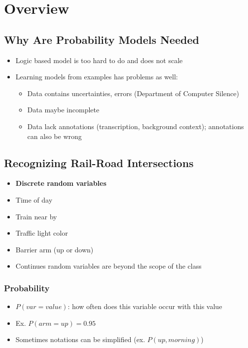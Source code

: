 \section{Overview}

  \subsection{Why Are Probability Models Needed}

    \begin{itemize}
      \item Logic based model is too hard to do and does not scale
      \item Learning models from examples has problems as well:
      \begin{itemize}
        \item Data contains uncertainties, errors (Department of Computer Silence)
        \item Data maybe incomplete
        \item Data lack annotations (transcription, background context);
        annotations can also be wrong
      \end{itemize}
    \end{itemize}

  \subsection{Recognizing Rail-Road Intersections}

    \begin{itemize}
      \item \textbf{Discrete random variables}
      \item Time of day
      \item Train near by
      \item Traffic light color
      \item Barrier arm (up or down)
      \item Continues random variables are beyond the scope of the class
    \end{itemize}

    \subsubsection{Probability}

      \begin{itemize}
        \item $ P(var = value) $: how often does this variable occur with this value
        \item Ex. $ P(arm = up) = 0.95 $
        \item Sometimes notations can be simplified (ex. $ P(up, morning) $)
      \end{itemize}

